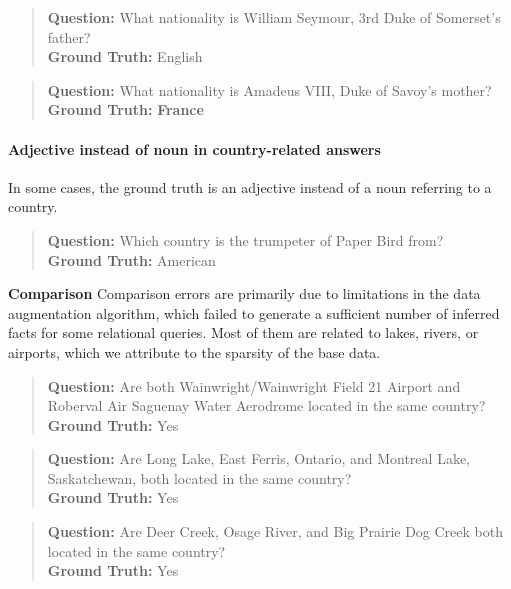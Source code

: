     \begin{quote}
    \textbf{Question:} What nationality is William Seymour, 3rd Duke of Somerset's father? \\ 
    \textbf{Ground Truth:} English
    \end{quote}
    
    \begin{quote}
    \textbf{Question:} What nationality is Amadeus VIII, Duke of Savoy's mother? \\ 
    \textbf{Ground Truth:} \textbf{France}
    \end{quote}
    
    \paragraph{Adjective instead of noun in country-related answers}
    In some cases, the ground truth is an adjective instead of a noun referring to a country.
    
    \begin{quote}
    \textbf{Question:} Which country is the trumpeter of Paper Bird from? \\ 
    \textbf{Ground Truth:} American
    \end{quote}
    
    \textbf{Comparison}
	Comparison errors are primarily due to limitations in the data augmentation algorithm, which failed to generate a sufficient number of inferred facts for some relational queries. Most of them are related to lakes, rivers, or airports, which we attribute to the sparsity of the base data.

            
        \begin{quote}
        \textbf{Question:} Are both Wainwright/Wainwright Field 21 Airport and Roberval Air Saguenay Water Aerodrome located in the same country? \\ 
        \textbf{Ground Truth:} Yes
        \end{quote}
        
        \begin{quote}
        \textbf{Question:} Are Long Lake, East Ferris, Ontario, and Montreal Lake, Saskatchewan, both located in the same country? \\ 
        \textbf{Ground Truth:} Yes
        \end{quote}
        
        \begin{quote}
        \textbf{Question:} Are Deer Creek, Osage River, and Big Prairie Dog Creek both located in the same country? \\ 
        \textbf{Ground Truth:} Yes
        \end{quote}
        
